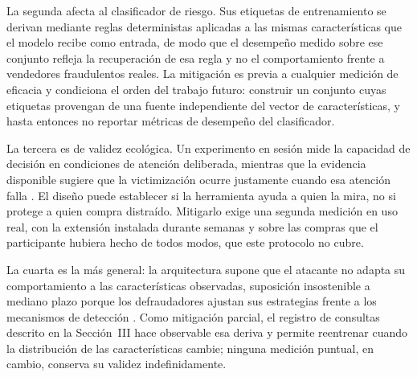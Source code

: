 La segunda afecta al clasificador de riesgo. Sus etiquetas de entrenamiento se derivan
mediante reglas deterministas aplicadas a las mismas características que el modelo recibe como
entrada, de modo que el desempeño medido sobre ese conjunto refleja la recuperación de esa
regla y no el comportamiento frente a vendedores fraudulentos reales. La mitigación es previa
a cualquier medición de eficacia y condiciona el orden del trabajo futuro: construir un
conjunto cuyas etiquetas provengan de una fuente independiente del vector de características,
y hasta entonces no reportar métricas de desempeño del clasificador.

La tercera es de validez ecológica. Un experimento en sesión mide la capacidad de decisión en
condiciones de atención deliberada, mientras que la evidencia disponible sugiere que la
victimización ocurre justamente cuando esa atención falla \cite{ref27}. El diseño puede
establecer si la herramienta ayuda a quien la mira, no si protege a quien compra distraído.
Mitigarlo exige una segunda medición en uso real, con la extensión instalada durante semanas y
sobre las compras que el participante hubiera hecho de todos modos, que este protocolo no
cubre.

La cuarta es la más general: la arquitectura supone que el atacante no adapta su
comportamiento a las características observadas, suposición insostenible a mediano plazo
porque los defraudadores ajustan sus estrategias frente a los mecanismos de detección
\cite{ref28}. Como mitigación parcial, el registro de consultas descrito en la Sección~III
hace observable esa deriva y permite reentrenar cuando la distribución de las características
cambie; ninguna medición puntual, en cambio, conserva su validez indefinidamente.
